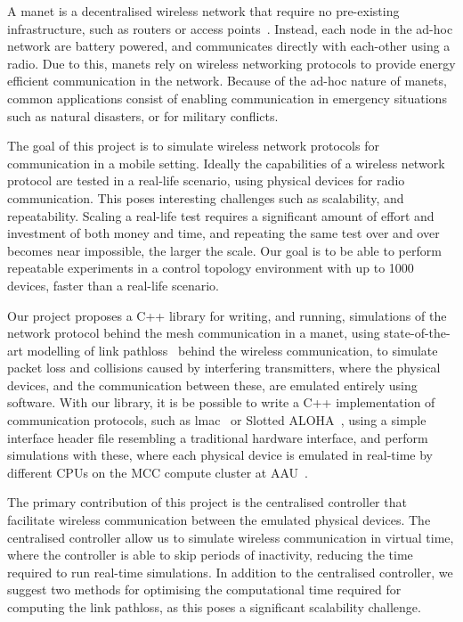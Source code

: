 A \gls{manet} is a decentralised wireless network that require no pre-existing infrastructure, such as routers or access points~\cite{inproceedings:routingsurvery}. Instead, each node in the ad-hoc network are battery powered, and communicates directly with each-other using a radio. Due to this, \gls{manet}s rely on wireless networking protocols to provide energy efficient communication in the network. Because of the ad-hoc nature of \gls{manet}s, common applications consist of enabling communication in emergency situations such as natural disasters, or for military conflicts.\smallbreak

The goal of this project is to simulate wireless network protocols for communication in a mobile setting. Ideally the capabilities of a wireless network protocol are tested in a real-life scenario, using physical devices for radio communication. This poses interesting challenges such as scalability, and repeatability. Scaling a real-life test requires a significant amount of effort and investment of both money and time, and repeating the same test over and over becomes near impossible, the larger the scale. Our goal is to be able to perform repeatable experiments in a control topology environment with up to 1000 devices, faster than a real-life scenario.\smallbreak

Our project proposes a C++ library for writing, and running, simulations of the network protocol behind the mesh communication in a \gls{manet}, using state-of-the-art modelling of link \gls{pathloss}~\cite{paper:linkmodel} behind the wireless communication, to simulate packet loss and collisions caused by interfering transmitters, where the physical devices, and the communication between these, are emulated entirely using software. With our library, it is be possible to write a C++ implementation of communication protocols, such as \gls{lmac}~\cite{paper:lmac_protocol} or Slotted ALOHA~\cite{Roberts:1975:APS:1024916.1024920}, using a simple interface header file resembling a traditional hardware interface, and perform simulations with these, where each physical device is emulated in real-time by different CPUs on the MCC compute cluster at AAU~\cite{website:mccaau}. \smallbreak

The primary contribution of this project is the centralised controller that facilitate wireless communication between the emulated physical devices. The centralised controller allow us to simulate wireless communication in virtual time, where the controller is able to skip periods of inactivity, reducing the time required to run real-time simulations. In addition to the centralised controller, we suggest two methods for optimising the computational time required for computing the link \gls{pathloss}, as this poses a significant scalability challenge.